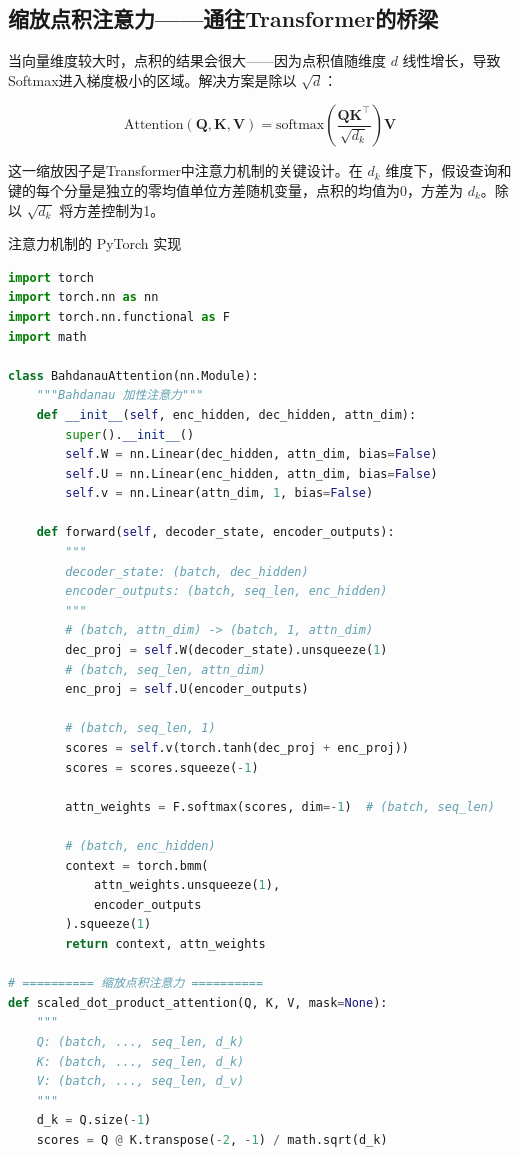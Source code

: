 \subsection{缩放点积注意力——通往Transformer的桥梁}

当向量维度较大时，点积的结果会很大——因为点积值随维度 $d$ 线性增长，导致Softmax进入梯度极小的区域。解决方案是除以 $\sqrt{d}$：

\[
\text{Attention}(\mathbf{Q}, \mathbf{K}, \mathbf{V}) = \text{softmax}\!\left(\frac{\mathbf{Q}\mathbf{K}^{\top}}{\sqrt{d_k}}\right)\mathbf{V}
\]

这一缩放因子是Transformer中注意力机制的关键设计。在 $d_k$ 维度下，假设查询和键的每个分量是独立的零均值单位方差随机变量，点积的均值为0，方差为 $d_k$。除以 $\sqrt{d_k}$ 将方差控制为1。

\begin{mycode}{注意力机制的 PyTorch 实现}
\begin{lstlisting}[language=Python]
import torch
import torch.nn as nn
import torch.nn.functional as F
import math

class BahdanauAttention(nn.Module):
    """Bahdanau 加性注意力"""
    def __init__(self, enc_hidden, dec_hidden, attn_dim):
        super().__init__()
        self.W = nn.Linear(dec_hidden, attn_dim, bias=False)
        self.U = nn.Linear(enc_hidden, attn_dim, bias=False)
        self.v = nn.Linear(attn_dim, 1, bias=False)

    def forward(self, decoder_state, encoder_outputs):
        """
        decoder_state: (batch, dec_hidden)
        encoder_outputs: (batch, seq_len, enc_hidden)
        """
        # (batch, attn_dim) -> (batch, 1, attn_dim)
        dec_proj = self.W(decoder_state).unsqueeze(1)
        # (batch, seq_len, attn_dim)
        enc_proj = self.U(encoder_outputs)

        # (batch, seq_len, 1)
        scores = self.v(torch.tanh(dec_proj + enc_proj))
        scores = scores.squeeze(-1)

        attn_weights = F.softmax(scores, dim=-1)  # (batch, seq_len)

        # (batch, enc_hidden)
        context = torch.bmm(
            attn_weights.unsqueeze(1),
            encoder_outputs
        ).squeeze(1)
        return context, attn_weights

# ========== 缩放点积注意力 ==========
def scaled_dot_product_attention(Q, K, V, mask=None):
    """
    Q: (batch, ..., seq_len, d_k)
    K: (batch, ..., seq_len, d_k)
    V: (batch, ..., seq_len, d_v)
    """
    d_k = Q.size(-1)
    scores = Q @ K.transpose(-2, -1) / math.sqrt(d_k)


\end{lstlisting}
\end{mycode}
